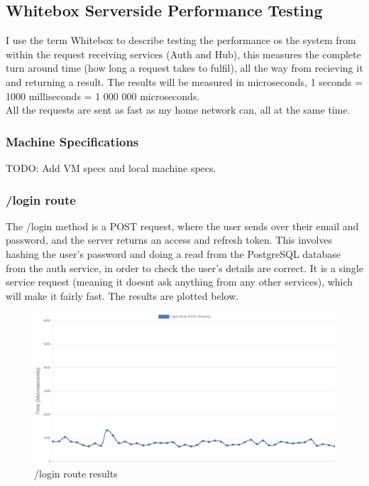 \documentclass[titlepage]{article}
\begin{document}
\subsection{Whitebox Serverside Performance Testing}
I use the term Whitebox to describe testing the performance os the system from within the request receiving services (Auth and Hub), this measures the complete turn around time (how long a request takes to fulfil), all the way from recieving it and returning a result. The results will be measured in microseconds, 1 seconds = 1000 milliseconds = 1 000 000 microseconds. \\

All the requests are sent as fast as my home network can, all at the same time.

\subsubsection{Machine Specifications}
TODO: Add VM specs and local machine specs.

\pagebreak
\subsubsection{/login route}
The /login method is a POST request, where the user sends over their email and password, and the server returns an access and refresh token. This involves hashing the user's password and doing a read from the PostgreSQL database from the auth service, in order to check the user's details are correct. It is a single service request (meaning it doesnt ask anything from any other services), which will make it fairly fast. The results are plotted below.

\begin{figure}[h!]
  \caption{/login route results}
\hspace*{-3cm}
\includegraphics[width=1.5\textwidth]{../results/login.png}
\end{figure}
\end{document}
